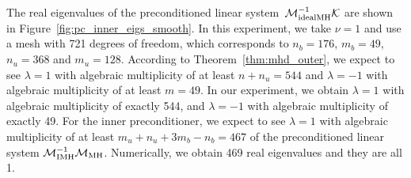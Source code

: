 \documentclass{siamltex}
\begin{document}
The real eigenvalues of the preconditioned linear system~${\mathcal{M}}_{\rm idealMH}^{-1} \mathcal{K}$ are shown in Figure~\ref{fig:pc_inner_eigs_smooth}.
In this experiment, we take $\nu=1$ and use a mesh with 721 degrees of freedom, which corresponds to $n_b=176$, $m_b=49$, $n_u = 368$ and $m_u =128$.  According to Theorem~\ref{thm:mhd_outer}, we expect to see $\lambda=1$ with algebraic multiplicity of at least $n+n_u = 544$ and $\lambda=-1$ with algebraic multiplicity of at least $m = 49$. In our experiment, we obtain
$\lambda = 1$ with algebraic multiplicity of exactly 544, and $\lambda = -1$ with algebraic multiplicity of exactly 49. For the inner preconditioner, we expect to see $\lambda = 1$ with algebraic multiplicity of at least $m_u + n_u + 3m_b - n_b = 467$ of the preconditioned linear system $\mathcal{M}_{\rm IMH}^{-1} \mathcal{M}_{\rm MH}$. Numerically, we obtain 469 real eigenvalues and they are all 1.
\end{document}
